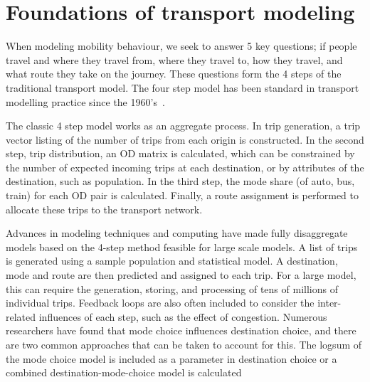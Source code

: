 \section{Foundations of transport modeling}
When modeling mobility behaviour, we seek to answer 5 key questions; if people travel and where they travel from, where they travel to, how they travel, and what route they take on the journey. These questions form the 4 steps of the traditional transport model. The four step model has been standard in transport modelling practice since the 1960's~\parencite{de1994modelling}. 

The classic 4 step model works as an aggregate process. In trip generation, a trip vector listing of the number of trips from each origin is constructed. In the second step, trip distribution, an OD matrix is calculated, which can be constrained by the number of expected incoming trips at each destination, or by attributes of the destination, such as population. In the third step, the mode share (of auto, bus, train) for each OD pair is calculated. Finally, a route assignment is performed to allocate these trips to the transport network. 

Advances in modeling techniques and computing have made fully disaggregate models based on the 4-step method feasible for large scale models. A list of trips is generated using a sample population and statistical model. A destination, mode and route are then predicted and assigned to each trip. For a large model, this can require the generation, storing, and processing of tens of millions of individual trips. Feedback loops are also often included to consider the inter-related influences of each step, such as the effect of congestion. Numerous researchers have found that mode choice influences destination choice, and there are two common approaches that can be taken to account for this. The logsum of the mode choice model is included as a parameter in destination choice \parencite{jonnalagadda2001development, mishra2011functional} or a combined destination-mode-choice model is calculated \parencite{newman2010hierarchical, adler1976joint, boyce1983implementation, Outwater15}

